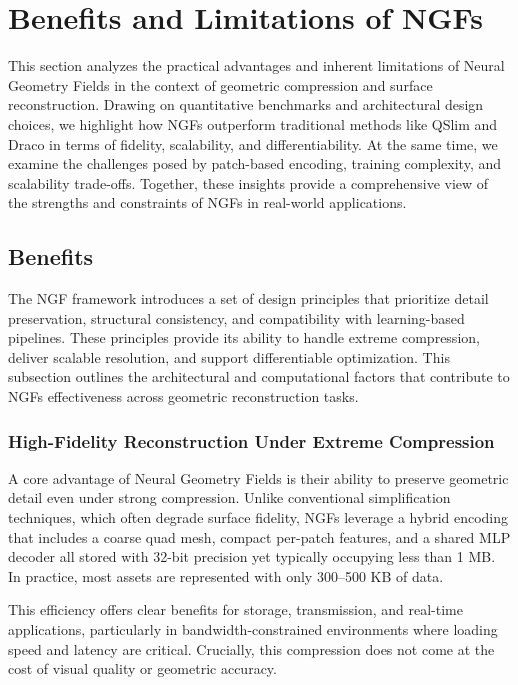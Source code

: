 \section{Benefits and Limitations of NGFs}\label{Sec:Evaluation}

This section analyzes the practical advantages and inherent limitations of Neural Geometry Fields in the context of geometric compression and surface reconstruction. 
Drawing on quantitative benchmarks and architectural design choices, we highlight how NGFs outperform traditional methods like QSlim and Draco in terms of fidelity, scalability, and differentiability. 
At the same time, we examine the challenges posed by patch-based encoding, training complexity, and scalability trade-offs. 
Together, these insights provide a comprehensive view of the strengths and constraints of NGFs in real-world applications.


\subsection{Benefits}

The NGF framework introduces a set of design principles that prioritize detail preservation, structural consistency, and compatibility with learning-based pipelines. 
These principles provide its ability to handle extreme compression, deliver scalable resolution, and support differentiable optimization. 
This subsection outlines the architectural and computational factors that contribute to NGFs effectiveness across geometric reconstruction tasks.

\subsubsection{High-Fidelity Reconstruction Under Extreme Compression}

A core advantage of Neural Geometry Fields is their ability to preserve geometric detail even under strong compression. 
Unlike conventional simplification techniques, which often degrade surface fidelity, NGFs leverage a hybrid encoding that includes a coarse quad mesh, compact per-patch features, and a shared MLP decoder all stored with 32-bit precision yet typically occupying less than 1 MB. 
In practice, most assets are represented with only 300--500 KB of data. 

This efficiency offers clear benefits for storage, transmission, and real-time applications, particularly in bandwidth-constrained environments where loading speed and latency are critical. 
Crucially, this compression does not come at the cost of visual quality or geometric accuracy. 

